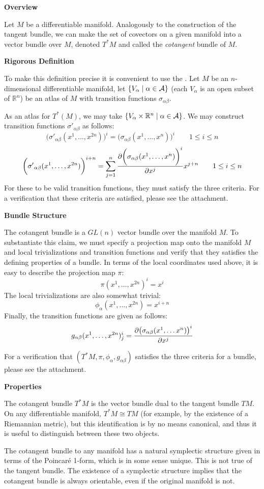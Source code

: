 \documentclass[12pt]{article}
\begin{document}
{\bf Overview}

Let $M$ be a differentiable manifold.  Analogously to the construction of the tangent bundle, we can make the set of covectors on a given manifold into a vector bundle over $M$, denoted $T^*M$ and called the {\em cotangent} bundle of $M$.  

{\bf Rigorous Definition}

To make this definition precise it is convenient to use the .  Let $M$ be an $n$-dimensional differentiable manifold, let $\{V_\alpha \mid \alpha \in {\cal A}\}$ (each $V_\alpha$ is an open subset of $\mathbb{R}^n$) be an atlas of $M$ with transition functions $\sigma_{\alpha \beta}$.

As an atlas for $T^* (M)$, we may take $\{V_\alpha \times \mathbb{R}^n \mid \alpha \in {\cal A}\}$.  We may construct transition functions ${\sigma'}_{\alpha \beta}$ as follows:
 $$\bigg({\sigma'}_{\alpha \beta} (x^1, \ldots, x^{2n}) \bigg)^i = \bigg(\sigma_{\alpha \beta} (x^1, \ldots, x^n) \bigg)^i \qquad 1 \le i \le n$$
 $$\bigg({\sigma'}_{\alpha \beta} (x^1, \ldots, x^{2n}) \bigg)^{i+n} = \sum_{j = 1}^n {\partial \bigg(\sigma_{\alpha \beta} (x^1, \ldots, x^n) \bigg)^i \over \partial x^j} x^{j+n} \qquad 1 \le i \le n$$
For these to be valid transition functions, they must satisfy the three criteria.  For a verification that these criteria are satisfied, please see the attachment.

{\bf Bundle Structure}

The cotangent bundle is a $GL(n)$ vector bundle over the manifold $M$.  To substantiate this claim, we must specify a projection map onto the manifold $M$ and local trivializations and transition functions and verify that they satisfies the defining properties of a bundle.  In terms of the local coordinates used above, it is easy to describe the projection map $\pi$:
 $${\pi (x^1, \ldots, x^{2n})}^i = x^i$$
The local trivializations are also somewhat trivial:
 $${\phi_\alpha (x^1, \ldots, x^{2n})} = x^{i+n}$$
Finally, the transition functions are given as follows:
 $$g_{\alpha \beta} (x^1, \ldots, x^{2n})^i_j = {\partial \big( \sigma_{\alpha \beta} (x^1, \ldots x^n) \big)^i \over \partial x^j}$$

For a verification that $( T^* M, \pi, \phi_\alpha, g_{\alpha \beta} )$ satisfies the three criteria for a bundle, please see the attachment.

{\bf Properties}

The cotangent bundle $T^*M$ is the vector bundle dual to the tangent bundle $TM$.  On any differentiable manifold, $T^*M \cong TM$ (for example, by the existence of a Riemannian metric), but this identification is by no means canonical, and thus it is useful to distinguish between these two objects. 

 The cotangent bundle to any manifold has a natural symplectic structure given in terms of the Poincar\'e 1-form, which is in some sense unique.  This is not true of the tangent bundle.  The existence of a symplectic structure implies that the cotangent bundle is always orientable, even if the original manifold is not.
\end{document}
